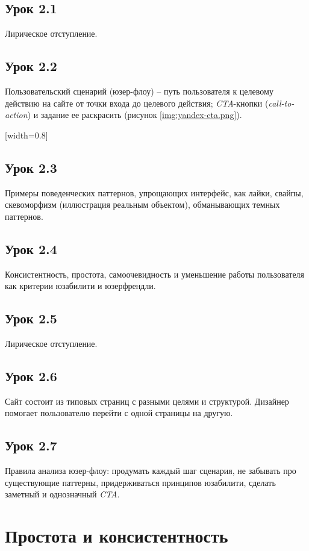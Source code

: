 \documentclass[variant=practice]{bsuir}
\begin{document}
\subsection{Урок 2.1} Лирическое отступление.

\subsection{Урок 2.2} Пользовательский сценарий (юзер-флоу) -- путь пользователя
к целевому действию на сайте от точки входа до целевого действия;
\textit{CTA}-кнопки (\textit{call-to-action}) и задание ее раскрасить (рисунок
\ref{img:yandex-cta.png}).

[width=0.8\textwidth]

\subsection{Урок 2.3} Примеры поведенческих паттернов, упрощающих интерфейс, как
лайки, свайпы, скевоморфизм (иллюстрация реальным объектом), обманывающих темных
паттернов.

\subsection{Урок 2.4} Консистентность, простота, самоочевидность и уменьшение
работы пользователя как критерии юзабилити и юзерфрендли.

\subsection{Урок 2.5} Лирическое отступление.

\subsection{Урок 2.6} Сайт состоит из типовых страниц с разными целями и
структурой. Дизайнер помогает пользователю перейти с одной страницы на другую.

\subsection{Урок 2.7} Правила анализа юзер-флоу: продумать каждый шаг сценария,
не забывать про существующие паттерны, придерживаться принципов юзабилити,
сделать заметный и однозначный \textit{CTA}.

\section{Простота и консистентность}
\end{document}
